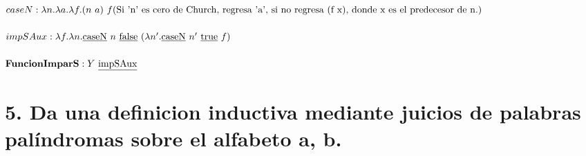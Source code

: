\documentclass[11pt, a4paper]{report}
\begin{document}
\begin{enumerate}[label=\alph*)]
    $ caseN: \lambda n.\lambda a.\lambda f.(n\ a)\ f\ \\ (\text{Si 'n' es cero de Church, regresa 'a', si no regresa (f x), donde x es el predecesor de n.})$\\\\
    $ impSAux: \lambda f.\lambda n.\text{\underline{caseN}}\ n\ \text{\underline{false}}\ (\lambda n'.\text{\underline{caseN}}\ n' \ \text{\underline{true}}\ f) $\\\\
      $ \text{\textbf{FuncionImparS}}: Y\ \text{\underline{impSAux}}$\\
  \end{enumerate}
  
  \section*{5. Da una definicion inductiva mediante juicios de palabras pal\'indromas sobre el alfabeto {a, b}.}
\end{document}
